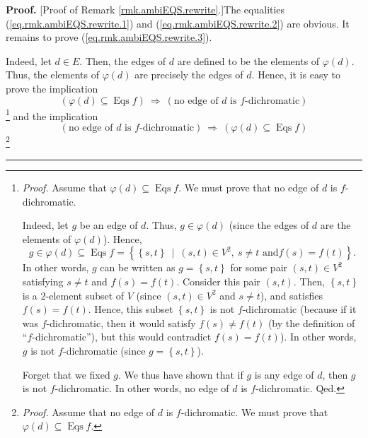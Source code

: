 \documentclass[numbers=enddot,12pt,final,onecolumn,notitlepage]{scrartcl}%
\theoremstyle{definition}
\newenvironment{proof}[1][Proof]{\noindent\textbf{#1.} }{\ \rule{0.5em}{0.5em}}
\newenvironment{verlong}{}{}
\begin{document}
\begin{verlong}
\begin{proof}
[Proof of Remark \ref{rmk.ambiEQS.rewrite}.]The equalities
(\ref{eq.rmk.ambiEQS.rewrite.1}) and (\ref{eq.rmk.ambiEQS.rewrite.2}) are
obvious. It remains to prove (\ref{eq.rmk.ambiEQS.rewrite.3}).

Indeed, let $d\in E$. Then, the edges of $d$ are defined to be the elements of
$\varphi\left(  d\right)  $. Thus, the elements of $\varphi\left(  d\right)  $
are precisely the edges of $d$. Hence, it is easy to prove the implication%
\[
\left(  \varphi\left(  d\right)  \subseteq\operatorname*{Eqs}f\right)
\ \Longrightarrow\ \left(  \text{no edge of }d\text{ is }f\text{-dichromatic}%
\right)
\]
\footnote{\textit{Proof.} Assume that $\varphi\left(  d\right)  \subseteq
\operatorname*{Eqs}f$. We must prove that no edge of $d$ is $f$-dichromatic.
\par
Indeed, let $g$ be an edge of $d$. Thus, $g\in\varphi\left(  d\right)  $
(since the edges of $d$ are the elements of $\varphi\left(  d\right)  $).
Hence,
\[
g\in\varphi\left(  d\right)  \subseteq\operatorname*{Eqs}f=\left\{  \left\{
s,t\right\}  \ \mid\ \left(  s,t\right)  \in V^{2},\ s\neq t\text{ and
}f\left(  s\right)  =f\left(  t\right)  \right\}  .
\]
In other words, $g$ can be written as $g=\left\{  s,t\right\}  $ for some pair
$\left(  s,t\right)  \in V^{2}$ satisfying $s\neq t$ and $f\left(  s\right)
=f\left(  t\right)  $. Consider this pair $\left(  s,t\right)  $. Then,
$\left\{  s,t\right\}  $ is a $2$-element subset of $V$ (since $\left(
s,t\right)  \in V^{2}$ and $s\neq t$), and satisfies $f\left(  s\right)
=f\left(  t\right)  $. Hence, this subset $\left\{  s,t\right\}  $ is not
$f$-dichromatic (because if it was $f$-dichromatic, then it would satisfy
$f\left(  s\right)  \neq f\left(  t\right)  $ (by the definition of
\textquotedblleft$f$-dichromatic\textquotedblright), but this would contradict
$f\left(  s\right)  =f\left(  t\right)  $). In other words, $g$ is not
$f$-dichromatic (since $g=\left\{  s,t\right\}  $).
\par
Forget that we fixed $g$. We thus have shown that if $g$ is any edge of $d$,
then $g$ is not $f$-dichromatic. In other words, no edge of $d$ is
$f$-dichromatic. Qed.} and the implication%
\[
\left(  \text{no edge of }d\text{ is }f\text{-dichromatic}\right)
\ \Longrightarrow\ \left(  \varphi\left(  d\right)  \subseteq
\operatorname*{Eqs}f\right)
\]
\footnote{\textit{Proof.} Assume that no edge of $d$ is $f$-dichromatic. We
must prove that $\varphi\left(  d\right)  \subseteq\operatorname*{Eqs}f$.
}
\end{proof}
\end{verlong}
\end{document}
